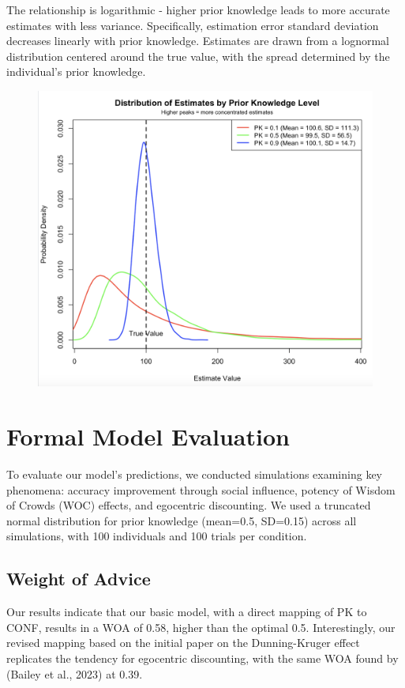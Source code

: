 \documentclass[
  man,floatsintext]{apa6}
\begin{document}
The relationship is logarithmic - higher prior knowledge leads to more accurate estimates with less variance. Specifically, estimation error standard deviation decreases linearly with prior knowledge. Estimates are drawn from a lognormal distribution centered around the true value, with the spread determined by the individual's prior knowledge.

\begin{figure}[H]
\includegraphics[width=4.56in]{photos/pk_estimate} \caption{ }\label{fig:unnamed-chunk-4}
\end{figure}

\hypertarget{formal-model-evaluation}{%
\section{Formal Model Evaluation}\label{formal-model-evaluation}}

To evaluate our model's predictions, we conducted simulations examining key phenomena: accuracy improvement through social influence, potency of Wisdom of Crowds (WOC) effects, and egocentric discounting. We used a truncated normal distribution for prior knowledge (mean=0.5, SD=0.15) across all simulations, with 100 individuals and 100 trials per condition.

\hypertarget{weight-of-advice-1}{%
\subsection{Weight of Advice}\label{weight-of-advice-1}}

Our results indicate that our basic model, with a direct mapping of PK to CONF, results in a WOA of 0.58, higher than the optimal 0.5. Interestingly, our revised mapping based on the initial paper on the Dunning-Kruger effect replicates the tendency for egocentric discounting, with the same WOA found by (Bailey et al., 2023) at 0.39.
\end{document}
